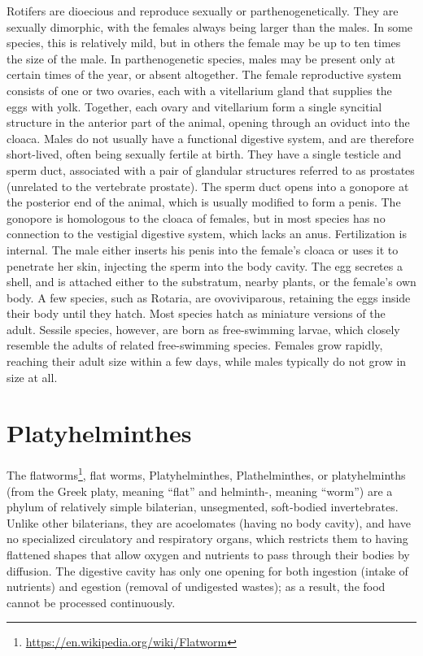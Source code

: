 \documentclass[]{book}
\let\rmarkdownfootnote\footnote%
\def\footnote{\protect\rmarkdownfootnote}
\renewcommand{\href}[2]{#2\footnote{\url{#1}}}
\begin{document}
Rotifers are dioecious and reproduce sexually or parthenogenetically. They are sexually dimorphic, with the females always being larger than the males. In some species, this is relatively mild, but in others the female may be up to ten times the size of the male. In parthenogenetic species, males may be present only at certain times of the year, or absent altogether.
The female reproductive system consists of one or two ovaries, each with a vitellarium gland that supplies the eggs with yolk. Together, each ovary and vitellarium form a single syncitial structure in the anterior part of the animal, opening through an oviduct into the cloaca.
Males do not usually have a functional digestive system, and are therefore short-lived, often being sexually fertile at birth. They have a single testicle and sperm duct, associated with a pair of glandular structures referred to as prostates (unrelated to the vertebrate prostate). The sperm duct opens into a gonopore at the posterior end of the animal, which is usually modified to form a penis. The gonopore is homologous to the cloaca of females, but in most species has no connection to the vestigial digestive system, which lacks an anus.
Fertilization is internal. The male either inserts his penis into the female's cloaca or uses it to penetrate her skin, injecting the sperm into the body cavity. The egg secretes a shell, and is attached either to the substratum, nearby plants, or the female's own body. A few species, such as Rotaria, are ovoviviparous, retaining the eggs inside their body until they hatch.
Most species hatch as miniature versions of the adult. Sessile species, however, are born as free-swimming larvae, which closely resemble the adults of related free-swimming species. Females grow rapidly, reaching their adult size within a few days, while males typically do not grow in size at all.

\hypertarget{platyhelminthes}{%
\section{Platyhelminthes}\label{platyhelminthes}}

The \href{https://en.wikipedia.org/wiki/Flatworm}{flatworms}, flat worms, Platyhelminthes, Plathelminthes, or platyhelminths (from the Greek platy, meaning ``flat'' and helminth-, meaning ``worm'') are a phylum of relatively simple bilaterian, unsegmented, soft-bodied invertebrates. Unlike other bilaterians, they are acoelomates (having no body cavity), and have no specialized circulatory and respiratory organs, which restricts them to having flattened shapes that allow oxygen and nutrients to pass through their bodies by diffusion. The digestive cavity has only one opening for both ingestion (intake of nutrients) and egestion (removal of undigested wastes); as a result, the food cannot be processed continuously.
\end{document}
